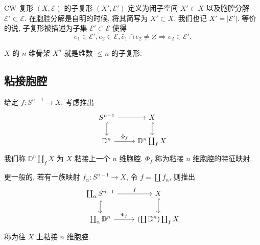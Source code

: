 \begin{definition}
    CW 复形 $(X,\mathcal{E})$ 的子复形 $(X',\mathcal{E}')$ 定义为闭子空间 $X'\subset X$ 以及胞腔分解 $\mathcal{E}'\subset \mathcal{E}$.
    在胞腔分解是自明的时候, 将其简写为 $X'\subset X$. 
    我们也记 $X' = |\mathcal{E}'|$. 等价的说, 子复形被描述为子集 $\mathcal{E}'\subset \mathcal{E}$ 使得
    \[
        e_1\in \mathcal{E}', e_2\in\mathcal{E}, \bar{e}_1\cap e_2 \neq \varnothing\Rightarrow e_2\in \mathcal{E}'.
    \] 
\end{definition}
\begin{example}
    $X$ 的 $n$ 维骨架 $X^n$ 就是维数 $\leq n$ 的子复形.
\end{example}
\subsection{粘接胞腔}
\begin{definition}
    给定 $f\colon S^{n-1} \to X$. 考虑推出
    \[\begin{tikzcd}
	{S^{n-1}} & X \\
	{\mathbb{D}^n} & {\mathbb{D}^n \coprod_f X}
	\arrow[from=1-1, to=1-2]
	\arrow[hook, from=1-1, to=2-1]
	\arrow[hook, from=1-2, to=2-2]
	\arrow["{\Phi_f}", from=2-1, to=2-2]
    \end{tikzcd}\]
    我们称 $\mathbb{D}^n \coprod_f X$ 为 $X$ 粘接上一个 $n$ 维胞腔. $\Phi_f$ 称为粘接 $n$ 维胞腔的特征映射. 

    更一般的, 若有一族映射 $f_{\alpha} \colon S^{n-1} \to X$, 令 $f = \coprod f_{\alpha}$, 则推出
    \[\begin{tikzcd}
	{\coprod_{\alpha}S^{n-1}} & X \\
	{\coprod_{\alpha}\mathbb{D}^n} & {\left(\coprod \mathbb{D}^n\right) \coprod_f X}
	\arrow["f", from=1-1, to=1-2]
	\arrow[hook, from=1-1, to=2-1]
	\arrow[hook, from=1-2, to=2-2]
	\arrow["{\Phi_f}", from=2-1, to=2-2]
    \end{tikzcd}\]
    称为往 $X$ 上粘接 $n$ 维胞腔.
\end{definition}
